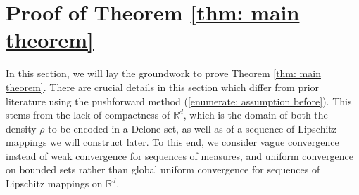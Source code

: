 \documentclass{article}
\newcommand{\R}{\mathbb{R}}
\begin{document}
\section{Proof of Theorem \ref{thm: main theorem}} \label{chapter: 1.10}
In this section, we will lay the groundwork to prove Theorem \ref{thm: main theorem}. There are crucial details in this section which differ from prior literature using the pushforward method (\ref{enumerate: assumption before}). This stems from the lack of compactness of $\R^d$, which is the domain of both the density $\rho$ to be encoded in a Delone set, as well as of a sequence of Lipschitz mappings we will construct later. To this end, we consider vague convergence instead of weak convergence for sequences of measures, and uniform convergence on bounded sets rather than global uniform convergence for sequences of Lipschitz mappings on $\R^d$.
\end{document}
